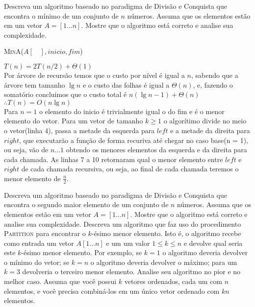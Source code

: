 \documentclass[a4paper]{exam}
\begin{document}
\begin{questions}
  \question Descreva um algoritmo baseado no paradigma de Divisão
  e Conquista que encontra o mínimo de um conjunto de $n$ números.
  Assuma que os elementos estão em um vetor $A = [1\ldots n]$.
  Mostre que o algoritmo está correto e analise sua complexidade.
  \begin{solution}
    \begin{algorithm}[H]
      \NoCaptionOfAlgo
      \DontPrintSemicolon
      \caption{\textsc{MinA}($A[\quad], inicio, fim$)}
    \end{algorithm}
      $T(n) = 2T(n/2) + \Theta(1)$\\

      Por árvore de recursão temos que o custo por nível é igual a $n$, sabendo que a árvore tem tamanho $\lg n$ 
      e o custo das folhas é igual a $\Theta(n)$, e, fazendo o somatório concluimos que o custo total é ${n(\lg n - 1) + \Theta(n)}$ \\
      $\therefore T(n) = O(n\lg n)$\\


    \quad Para $n=1$ o elemento do inicio é trivialmente igual o do fim e é o menor elemento do vetor. Para um vetor de tamanho $k \geq 1$ o algorítimo divide no meio o vetor(linha 4), passa a metade da esquerda para $left$ e a metade da direita para $right$, que executarão a função de forma recuriva até chegar no caso base(n = 1), ou seja, vão de $n \ldots 1 $ obtendo os menores elementos da esquerda e da direita para cada chamada. As linhas 7 a 10 retornaram qual o menor elemento entre $left$  e $right$ de cada chamada recursiva, ou seja, ao final de cada chamada teremos o menor elemento de $\frac{n}{2}$. 
  \end{solution}
  \question Descreva um algoritmo baseado no paradigma de Divisão
  e Conquista que encontra o segundo maior elemento de um conjunto
  de $n$ números. Assuma que os elementos estão
  em um vetor $A = [1\ldots n]$. Mostre que o algoritmo está
  correto e analise sua complexidade.
  \question Descreva um algoritmo que faz uso do procedimento
  \textsc{Partition} para encontrar o $k$-ésimo menor elemento.
  Isto é, o algoritmo recebe como entrada um vetor $A[1 \ldots n]$ e um
  um valor $1 \leq k \leq n$ e devolve qual seria este $k$-ésimo
  menor elemento. Por exemplo, se $k = 1$ o algoritmo deveria
  devolver o mínimo do vetor; se $k=n$ o algoritmo deveria devolver
  o máximo; para um $k=3$ devolveria o terceiro menor elemento.
  Analise seu algoritmo no pior e no melhor caso.
  \question Assuma que você possui $k$ vetores ordenados, cada um
  com $n$ elementos, e você precisa combiná-los em um único vetor
  ordenado com $k n$ elementos.
  \begin{parts}

\end{parts}
\end{questions}
\end{document}
